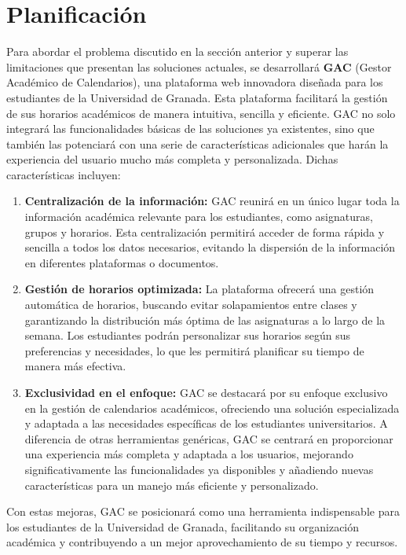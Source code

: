 \chapter{Planificación}

Para abordar el problema discutido en la sección anterior y superar las limitaciones que presentan las soluciones actuales, se desarrollará \textbf{GAC} (Gestor Académico de Calendarios), una plataforma web innovadora diseñada para los estudiantes de la Universidad de Granada. Esta plataforma facilitará la gestión de sus horarios académicos de manera intuitiva, sencilla y eficiente. GAC no solo integrará las funcionalidades básicas de las soluciones ya existentes, sino que también las potenciará con una serie de características adicionales que harán la experiencia del usuario mucho más completa y personalizada. Dichas características incluyen:

\begin{enumerate} 
    \item \textbf{Centralización de la información:} GAC reunirá en un único lugar toda la información académica relevante para los estudiantes, como asignaturas, grupos y horarios. Esta centralización permitirá acceder de forma rápida y sencilla a todos los datos necesarios, evitando la dispersión de la información en diferentes plataformas o documentos.

    \item \textbf{Gestión de horarios optimizada:} La plataforma ofrecerá una gestión automática de horarios, buscando evitar solapamientos entre clases y garantizando la distribución más óptima de las asignaturas a lo largo de la semana. Los estudiantes podrán personalizar sus horarios según sus preferencias y necesidades, lo que les permitirá planificar su tiempo de manera más efectiva.

    \item \textbf{Exclusividad en el enfoque:} GAC se destacará por su enfoque exclusivo en la gestión de calendarios académicos, ofreciendo una solución especializada y adaptada a las necesidades específicas de los estudiantes universitarios. A diferencia de otras herramientas genéricas, GAC se centrará en proporcionar una experiencia más completa y adaptada a los usuarios, mejorando significativamente las funcionalidades ya disponibles y añadiendo nuevas características para un manejo más eficiente y personalizado. 
\end{enumerate}

Con estas mejoras, GAC se posicionará como una herramienta indispensable para los estudiantes de la Universidad de Granada, facilitando su organización académica y contribuyendo a un mejor aprovechamiento de su tiempo y recursos.

